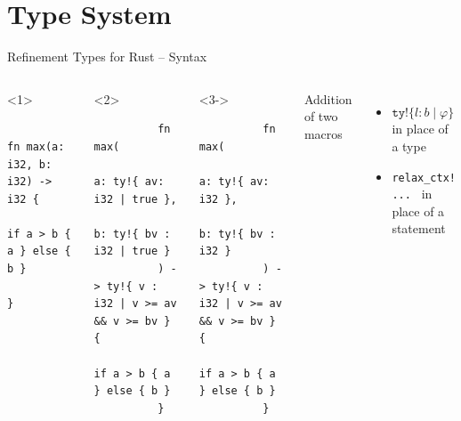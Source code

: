 \documentclass{sdqbeamer}
\newcommand{\code}[1]{\texttt{#1}}
\begin{document}
\section{Type System}

\begin{frame}[fragile]{Refinement Types for Rust -- Syntax}
  \begin{columns}
      \begin{onlyenv}<1>
        \begin{verbatim}
          fn max(a: i32, b: i32) -> i32 {
            if a > b { a } else { b }
          }
        \end{verbatim}
      \end{onlyenv}
      \begin{onlyenv}<2>
        \begin{verbatim}
          fn max(
            a: ty!{ av: i32 | true }, 
            b: ty!{ bv : i32 | true }
          ) -> ty!{ v : i32 | v >= av && v >= bv } {
            if a > b { a } else { b }
          }
        \end{verbatim}
      \end{onlyenv}
      \begin{onlyenv}<3->
        \begin{verbatim}
          fn max(
            a: ty!{ av: i32 }, 
            b: ty!{ bv : i32 }
          ) -> ty!{ v : i32 | v >= av && v >= bv } {
            if a > b { a } else { b }
          }
        \end{verbatim}
      \end{onlyenv}

    Addition of two macros
    \begin{itemize}
      \item $\code{ty!}\{ l : b \mid \varphi \}$ in place of a type
      \item \texttt{relax_ctx!{ ... }} in place of a statement
    \end{itemize}
  \end{columns}
\end{frame}
\end{document}
